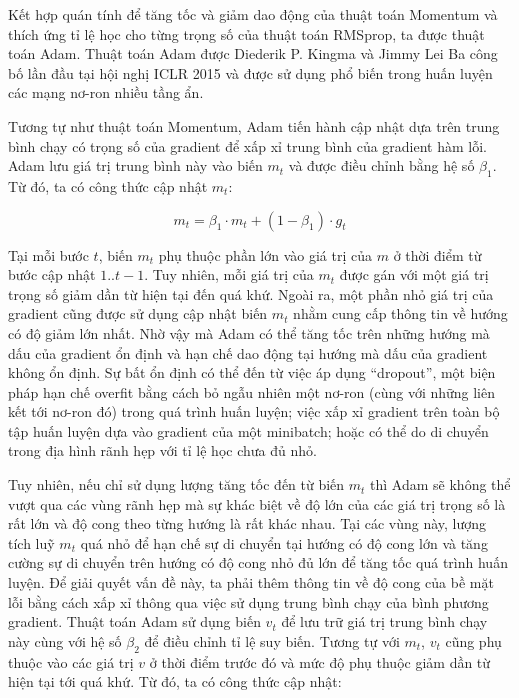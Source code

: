 Kết hợp quán tính để tăng tốc và giảm dao động của thuật toán Momentum và thích ứng tỉ lệ học cho từng trọng số của thuật toán RMSprop, ta được thuật toán Adam. Thuật toán Adam \cite{kingma2014adam} được Diederik P. Kingma và Jimmy Lei Ba công bố lần đầu tại hội nghị ICLR 2015 và được sử dụng phổ biến trong huấn luyện các mạng nơ-ron nhiều tầng ẩn.

Tương tự như thuật toán Momentum, Adam tiến hành cập nhật dựa trên trung bình chạy có trọng số của gradient để xấp xỉ trung bình của gradient hàm lỗi. Adam lưu giá trị trung bình này vào biến $m_t$ và được điều chỉnh bằng hệ số $\beta_1$. Từ đó, ta có công thức cập nhật $m_t$:

\begin{equation} \label{eqn:adam-m}
	m_t = \beta_1 \cdot m_t + (1 - \beta_1) \cdot g_t
\end{equation}

Tại mỗi bước $t$, biến $m_t$ phụ thuộc phần lớn vào giá trị của $m$ ở thời điểm từ bước cập nhật $1..t-1$. Tuy nhiên, mỗi giá trị của $m_t$ được gán với một giá trị trọng số giảm dần từ hiện tại đến quá khứ. Ngoài ra, một phần nhỏ giá trị của gradient cũng được sử dụng cập nhật biến $m_t$ nhằm cung cấp thông tin về hướng có độ giảm lớn nhất. Nhờ vậy mà Adam có thể tăng tốc trên những hướng mà dấu của gradient ổn định và hạn chế dao động tại hướng mà dấu của gradient không ổn định. Sự bất ổn định có thể đến từ việc áp dụng ``dropout'', một biện pháp hạn chế overfit bằng cách bỏ ngẫu nhiên một nơ-ron (cùng với những liên kết tới nơ-ron đó) trong quá trình huấn luyện; việc xấp xỉ gradient trên toàn bộ tập huấn luyện dựa vào gradient của một minibatch; hoặc có thể do di chuyển trong địa hình rãnh hẹp với tỉ lệ học chưa đủ nhỏ.

Tuy nhiên, nếu chỉ sử dụng lượng tăng tốc đến từ biến $m_t$ thì Adam sẽ không thể vượt qua các vùng rãnh hẹp mà sự khác biệt về độ lớn của các giá trị trọng số là rất lớn và độ cong theo từng hướng là rất khác nhau. Tại các vùng này, lượng tích luỹ $m_t$ quá nhỏ để hạn chế sự di chuyển tại hướng có độ cong lớn và tăng cường sự di chuyển trên hướng có độ cong nhỏ đủ lớn để tăng tốc quá trình huấn luyện. Để giải quyết vấn đề này, ta phải thêm thông tin về độ cong của bề mặt lỗi bằng cách xấp xỉ thông qua việc sử dụng trung bình chạy của bình phương gradient. Thuật toán Adam sử dụng biến $v_t$ để lưu trữ giá trị trung bình chạy này cùng với hệ số $\beta_2$ để điều chỉnh tỉ lệ suy biến. Tương tự với $m_t$, $v_t$ cũng phụ thuộc vào các giá trị $v$ ở thời điểm trước đó và mức độ phụ thuộc giảm dần từ hiện tại tới quá khứ. Từ đó, ta có công thức cập nhật:

